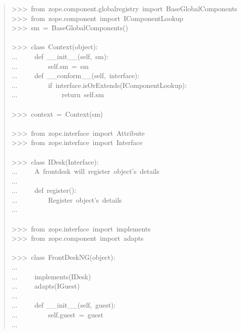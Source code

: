 \documentclass[a4paper,openany,twoside,final]{book}
\begin{document}
\begin{quote}{\ttfamily \raggedright \noindent
>{}>{}>~from~zope.component.globalregistry~import~BaseGlobalComponents\\
>{}>{}>~from~zope.component~import~IComponentLookup\\
>{}>{}>~sm~=~BaseGlobalComponents()\\
~\\
>{}>{}>~class~Context(object):\\
...~~~~~def~\_\_init\_\_(self,~sm):\\
...~~~~~~~~~self.sm~=~sm\\
...~~~~~def~\_\_conform\_\_(self,~interface):\\
...~~~~~~~~~if~interface.isOrExtends(IComponentLookup):\\
...~~~~~~~~~~~~~return~self.sm\\
~\\
>{}>{}>~context~=~Context(sm)\\
~\\
>{}>{}>~from~zope.interface~import~Attribute\\
>{}>{}>~from~zope.interface~import~Interface\\
~\\
>{}>{}>~class~IDesk(Interface):\\
...~~~~~\textquotedbl{}\textquotedbl{}\textquotedbl{}A~frontdesk~will~register~object's~details\textquotedbl{}\textquotedbl{}\textquotedbl{}\\
...\\
...~~~~~def~register():\\
...~~~~~~~~~\textquotedbl{}\textquotedbl{}\textquotedbl{}Register~object's~details\textquotedbl{}\textquotedbl{}\textquotedbl{}\\
...\\
~\\
>{}>{}>~from~zope.interface~import~implements\\
>{}>{}>~from~zope.component~import~adapts\\
~\\
>{}>{}>~class~FrontDeskNG(object):\\
...\\
...~~~~~implements(IDesk)\\
...~~~~~adapts(IGuest)\\
...\\
...~~~~~def~\_\_init\_\_(self,~guest):\\
...~~~~~~~~~self.guest~=~guest\\
...\\
}
\end{quote}
\end{document}
